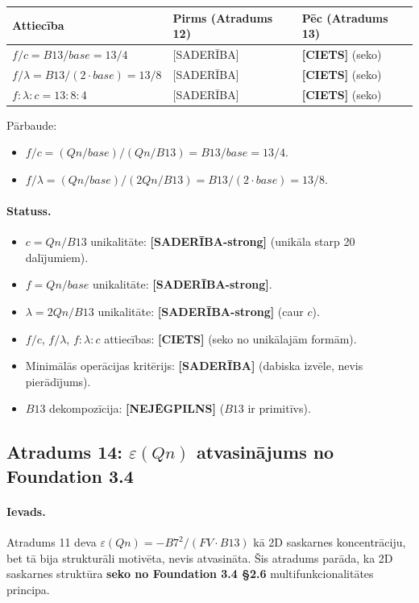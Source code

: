 \documentclass[12pt,a4paper]{article}
\begin{document}
\begin{table}[h]
\centering
\begin{tabular}{|l|l|l|}
\hline
\textbf{Attiecība} & \textbf{Pirms (Atradums 12)} & \textbf{Pēc (Atradums 13)} \\
\hline
$f/c = B13/base = 13/4$ & [SADERĪBA] & \textbf{[CIETS]} (seko) \\
$f/\lambda = B13/(2 \cdot base) = 13/8$ & [SADERĪBA] & \textbf{[CIETS]} (seko) \\
$f : \lambda : c = 13 : 8 : 4$ & [SADERĪBA] & \textbf{[CIETS]} (seko) \\
\hline
\end{tabular}
\end{table}

Pārbaude:
\begin{itemize}
    \item $f/c = (Qn/base)/(Qn/B13) = B13/base = 13/4$. \checkmark
    \item $f/\lambda = (Qn/base)/(2Qn/B13) = B13/(2 \cdot base) = 13/8$. \checkmark
\end{itemize}

\paragraph{Statuss.}
\begin{itemize}
    \item $c = Qn/B13$ unikalitāte: \textbf{[SADERĪBA-strong]} (unikāla starp 20 dalījumiem).
    \item $f = Qn/base$ unikalitāte: \textbf{[SADERĪBA-strong]}.
    \item $\lambda = 2Qn/B13$ unikalitāte: \textbf{[SADERĪBA-strong]} (caur $c$).
    \item $f/c$, $f/\lambda$, $f:\lambda:c$ attiecības: \textbf{[CIETS]} (seko no unikālajām formām).
    \item Minimālās operācijas kritērijs: \textbf{[SADERĪBA]} (dabiska izvēle, nevis pierādījums).
    \item $B13$ dekompozīcija: \textbf{[NEJĒGPILNS]} ($B13$ ir primitīvs).
\end{itemize}

\subsection*{Atradums 14: $\varepsilon(Qn)$ atvasinājums no Foundation 3.4}

\paragraph{Ievads.}
Atradums 11 deva $\varepsilon(Qn) = -B7^2/(FV \cdot B13)$ kā 2D saskarnes koncentrāciju, bet tā bija strukturāli motivēta, nevis atvasināta. Šis atradums parāda, ka 2D saskarnes struktūra \textbf{seko no Foundation 3.4 §2.6} multifunkcionalitātes principa.
\end{document}
